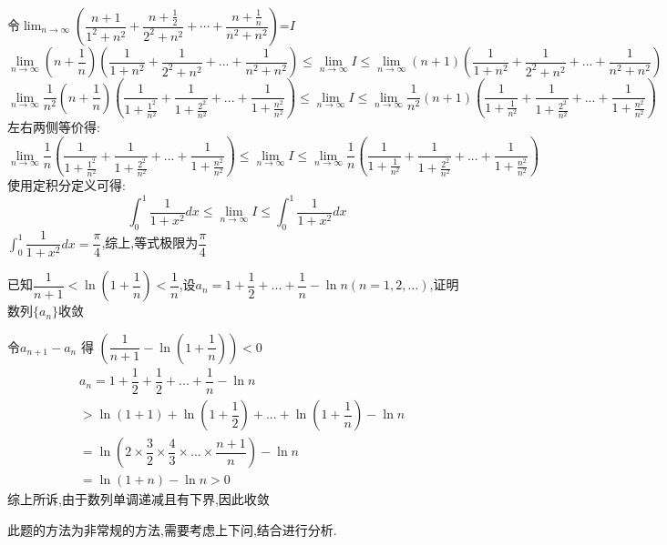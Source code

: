 \documentclass[8pt a4paper, oneside, UTF8]{ctexbook}
\begin{document}
\begin{sloppypar}
\begin{problem}
    \end{problem}
    \begin{solution}
        令$\lim_{n\to\infty}\left(\dfrac{n+1}{1^{2}+n^{2}}+\dfrac{n+\frac{1}{2}}{2^{2}+n^{2}}+\cdots+\dfrac{n+\frac{1}{n}}{n^{2}+n^{2}}\right)$=$I$
            $$
                \lim_{n \to \infty} (n+\frac{1}{n})(\dfrac{1}{1+n^2}+\dfrac{1}{2^2+n^2}+...+\dfrac{1}{n^2+n^2}) \leqslant   \lim_{n\to \infty}I \leqslant \lim_{n \to \infty} (n+1)(\dfrac{1}{1+n^2}+\dfrac{1}{2^2+n^2}+...+\dfrac{1}{n^2+n^2})
            $$
            $$
                \lim_{n \to \infty} \dfrac{1}{n^2}(n+\frac{1}{n})(\dfrac{1}{1+\frac{1^2}{n^2}}+\dfrac{1}{1+\frac{2^2}{n^2}}+...+\dfrac{1}{1+\frac{n^2}{n^2}}) \leqslant \lim_{n\to \infty}I \leqslant \lim_{n \to \infty}\frac{1}{n^2} (n+1)(\dfrac{1}{1+\frac{1}{n^2}}+\dfrac{1}{1+\frac{2^2}{n^2}}+...+\dfrac{1}{1+\frac{n^2}{n^2}})
            $$
            左右两侧等价得:
            $$
            \lim_{n \to \infty} \dfrac{1}{n}(\dfrac{1}{1+\frac{1^2}{n^2}}+\dfrac{1}{1+\frac{2^2}{n^2}}+...+\dfrac{1}{1+\frac{n^2}{n^2}}) \leqslant \lim_{n\to \infty} I \leqslant \lim_{n \to \infty}\frac{1}{n}(\dfrac{1}{1+\frac{1}{n^2}}+\dfrac{1}{1+\frac{2^2}{n^2}}+...+\dfrac{1}{1+\frac{n^2}{n^2}})
            $$
            使用定积分定义可得:
            $$
            \int_0 ^1 \dfrac{1}{1+x^2}dx \leqslant \lim_{n\to \infty} I \leqslant \int_0^1 \dfrac{1}{1+x^2}dx
            $$
        $\int_0 ^1 \dfrac{1}{1+x^2}dx=\dfrac{\pi}{4}$,综上,等式极限为$\dfrac{\pi}{4}$
    \end{solution}
    \begin{problem}
        已知$\dfrac1{n+1}<\ln(1+\dfrac1n)<\dfrac1n$,设$a_n=1+\dfrac12+...+\dfrac1n-\ln n(n=1,2,...)$,证明数列$\{a_n\}$收敛
    \end{problem}
    \begin{solution}
        令$a_{n+1}-a_n$ 得 $(\dfrac{1}{n+1}-\ln(1+\dfrac{1}{n}))<0$
        \begin{align*}
          & a_n= 1+\dfrac{1}{2}+\dfrac{1}{2}+...+\dfrac{1}{n}-\ln n\\
          & > \ln(1+1)+\ln(1+\dfrac{1}{2})+...+\ln(1+\dfrac{1}{n})-\ln n \\
          & =\ln(2 \times \dfrac{3}{2} \times \dfrac{4}{3} \times ... \times \dfrac{n+1}{n})-\ln n\\
          & = \ln(1+n)-\ln n >0
        \end{align*}
    综上所诉,由于数列单调递减且有下界,因此收敛
    \end{solution}
    \begin{note}
        此题的方法为非常规的方法,需要考虑上下问,结合进行分析.
    \end{note}

\end{sloppypar}
\end{document}
